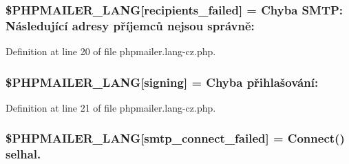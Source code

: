 \subsubsection[{\texorpdfstring{\$\+P\+H\+P\+M\+A\+I\+L\+E\+R\+\_\+\+L\+A\+NG}{$PHPMAILER_LANG}}]{\setlength{\rightskip}{0pt plus 5cm}\$P\+H\+P\+M\+A\+I\+L\+E\+R\+\_\+\+L\+A\+NG\mbox{[}\textquotesingle{}recipients\+\_\+failed\textquotesingle{}\mbox{]} = \textquotesingle{}Chyba S\+M\+T\+P\+: Následující adresy příjemců nejsou správně\+: \textquotesingle{}}\hypertarget{phpmailer_8lang-cz_8php_a7589d30bb9b368327c2df015f3e6bcba}{}\label{phpmailer_8lang-cz_8php_a7589d30bb9b368327c2df015f3e6bcba}


Definition at line 20 of file phpmailer.\+lang-\/cz.\+php.

\subsubsection[{\texorpdfstring{\$\+P\+H\+P\+M\+A\+I\+L\+E\+R\+\_\+\+L\+A\+NG}{$PHPMAILER_LANG}}]{\setlength{\rightskip}{0pt plus 5cm}\$P\+H\+P\+M\+A\+I\+L\+E\+R\+\_\+\+L\+A\+NG\mbox{[}\textquotesingle{}signing\textquotesingle{}\mbox{]} = \textquotesingle{}Chyba přihlašování\+: \textquotesingle{}}\hypertarget{phpmailer_8lang-cz_8php_a68e437bdb9b968a5a67320f03d231565}{}\label{phpmailer_8lang-cz_8php_a68e437bdb9b968a5a67320f03d231565}


Definition at line 21 of file phpmailer.\+lang-\/cz.\+php.

\subsubsection[{\texorpdfstring{\$\+P\+H\+P\+M\+A\+I\+L\+E\+R\+\_\+\+L\+A\+NG}{$PHPMAILER_LANG}}]{\setlength{\rightskip}{0pt plus 5cm}\$P\+H\+P\+M\+A\+I\+L\+E\+R\+\_\+\+L\+A\+NG\mbox{[}\textquotesingle{}smtp\+\_\+connect\+\_\+failed\textquotesingle{}\mbox{]} =  Connect() selhal.\textquotesingle{}}\hypertarget{phpmailer_8lang-cz_8php_a7b321d4ca1e9df702403ed4c61aa0980}{}\label{phpmailer_8lang-cz_8php_a7b321d4ca1e9df702403ed4c61aa0980}


